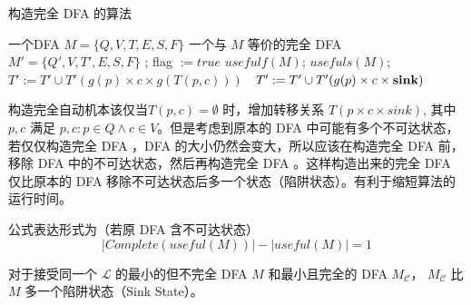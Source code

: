 \begin{algorithm}
    \caption{ 构造完全 DFA 的算法 }\label{al:complete-M}
    \small%
    \begin{algorithmic}[1]
        \Require 一个DFA $M=\{Q,V,T,E,S,F\}$
        \Ensure 一个与 $M$ 等价的完全 DFA $M'=\{Q',V,T',E,S,F\}$
        \Statex {}
            ;
                        {flag $:=true$}
                    \EndIf
                \EndFor
            \EndFor
                \State $usefulf(M)$; 
                \State $usefuls(M)$; 
                            $T':= T' \cup T'(g(p)\times c \times g(T(p,c)))$
                        \Else
                            $~~T' := T' \cup T'(g(p)\times c \times \mbox{\bfseries sink})$
                        \EndIf
                    \EndFor
                \EndFor
            \EndIf
        \EndFunction
    \end{algorithmic}
\end{algorithm}

\begin{remark}
    构造完全自动机本该仅当$T(p , c ) = \emptyset $ 时，增加转移关系 $T(p \times c \times sink)$, 其中 $p,c$ 满足 $ p,c:p\in Q \land c \in V $。但是考虑到原本的 DFA 中可能有多个不可达状态，若仅仅构造完全 DFA ，DFA 的大小仍然会变大，所以应该在构造完全 DFA 前，移除 DFA 中的不可达状态，然后再构造完全 DFA 。这样构造出来的完全 DFA 仅比原本的 DFA 移除不可达状态后多一个状态（陷阱状态）。有利于缩短算法的运行时间。
\end{remark}

公式表达形式为（若原 DFA 含不可达状态）
    \begin{equation}
        |Complete( useful (M))| -  |useful (M)| = 1
    \end{equation}

\begin{remark}
    对于接受同一个 $\mathcal{L}$ 的最小的但不完全 DFA $M$ 和最小且完全的 DFA $M_{\mathcal{C}}$， $M_{\mathcal{C}}$ 比 $M$ 多一个陷阱状态（Sink State）\cite{watson1993taxonomyb}。
\end{remark}

